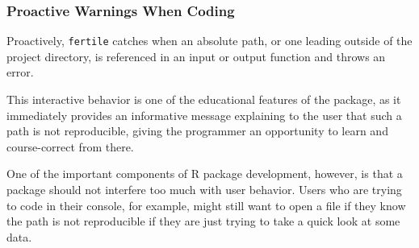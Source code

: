 \documentclass[12pt,twoside]{reedthesis}
\begin{document}
\subsubsection{Proactive Warnings When
Coding}\label{proactive-warnings-when-coding}

Proactively, \texttt{fertile} catches when an absolute path, or one
leading outside of the project directory, is referenced in an input or
output function and throws an error.

This interactive behavior is one of the educational features of the
package, as it immediately provides an informative message explaining to
the user that such a path is not reproducible, giving the programmer an
opportunity to learn and course-correct from there.

One of the important components of R package development, however, is
that a package should not interfere too much with user behavior. Users
who are trying to code in their console, for example, might still want
to open a file if they know the path is not reproducible if they are
just trying to take a quick look at some data.
\end{document}
